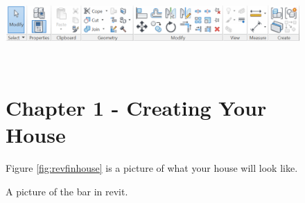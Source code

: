 \documentclass{tufte-book} %
\begin{document}
\begin{figure}
	\includegraphics[width=\linewidth]{revitmodifytab.png}
	\caption[The modify bar]{A picture of the  bar in revit.}
	\label{fig:revmodtab}
\



\mainmatter


\chapter{Chapter 1 - Creating Your House}
\label{ch:1}
Figure \ref{fig:revfinhouse} is a picture of what your house will look like.



\end{figure}
\end{document}
